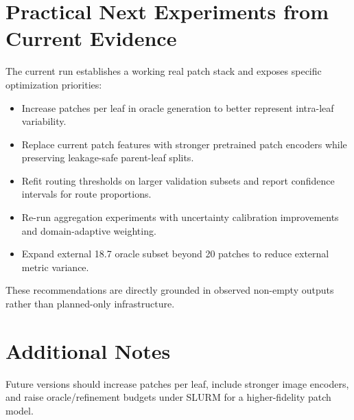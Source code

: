 \documentclass[11pt,a4paper]{article}
\begin{document}
\section{Practical Next Experiments from Current Evidence}
The current run establishes a working real patch stack and exposes specific optimization priorities:
\begin{itemize}
\item Increase patches per leaf in oracle generation to better represent intra-leaf variability.
\item Replace current patch features with stronger pretrained patch encoders while preserving leakage-safe parent-leaf splits.
\item Refit routing thresholds on larger validation subsets and report confidence intervals for route proportions.
\item Re-run aggregation experiments with uncertainty calibration improvements and domain-adaptive weighting.
\item Expand external 18.7 oracle subset beyond 20 patches to reduce external metric variance.
\end{itemize}
These recommendations are directly grounded in observed non-empty outputs rather than planned-only infrastructure.

\appendix
\section{Additional Notes}
Future versions should increase patches per leaf, include stronger image encoders, and raise oracle/refinement budgets under SLURM for a higher-fidelity patch model.
\end{document}
